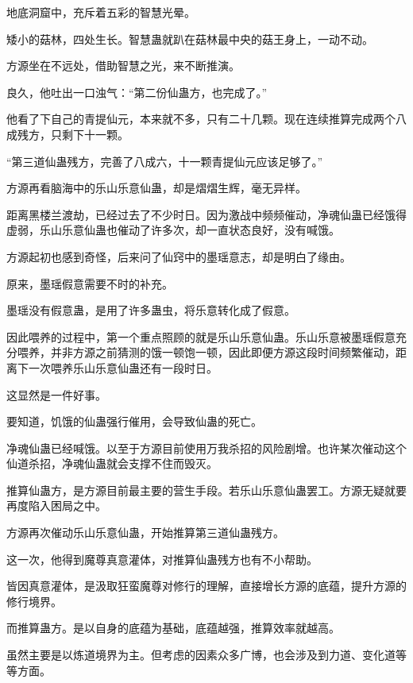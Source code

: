 
\begin{this_body}



地底洞窟中，充斥着五彩的智慧光晕。

矮小的菇林，四处生长。智慧蛊就趴在菇林最中央的菇王身上，一动不动。

方源坐在不远处，借助智慧之光，来不断推演。

良久，他吐出一口浊气：“第二份仙蛊方，也完成了。”

他看了下自己的青提仙元，本来就不多，只有二十几颗。现在连续推算完成两个八成残方，只剩下十一颗。

“第三道仙蛊残方，完善了八成六，十一颗青提仙元应该足够了。”

方源再看脑海中的乐山乐意仙蛊，却是熠熠生辉，毫无异样。

距离黑楼兰渡劫，已经过去了不少时日。因为激战中频频催动，净魂仙蛊已经饿得虚弱，乐山乐意仙蛊也催动了许多次，却一直状态良好，没有喊饿。

方源起初也感到奇怪，后来问了仙窍中的墨瑶意志，却是明白了缘由。

原来，墨瑶假意需要不时的补充。

墨瑶没有假意蛊，是用了许多蛊虫，将乐意转化成了假意。

因此喂养的过程中，第一个重点照顾的就是乐山乐意仙蛊。乐山乐意被墨瑶假意充分喂养，并非方源之前猜测的饿一顿饱一顿，因此即便方源这段时间频繁催动，距离下一次喂养乐山乐意仙蛊还有一段时日。

这显然是一件好事。

要知道，饥饿的仙蛊强行催用，会导致仙蛊的死亡。

净魂仙蛊已经喊饿。以至于方源目前使用万我杀招的风险剧增。也许某次催动这个仙道杀招，净魂仙蛊就会支撑不住而毁灭。

推算仙蛊方，是方源目前最主要的营生手段。若乐山乐意仙蛊罢工。方源无疑就要再度陷入困局之中。

方源再次催动乐山乐意仙蛊，开始推算第三道仙蛊残方。

这一次，他得到魔尊真意灌体，对推算仙蛊残方也有不小帮助。

皆因真意灌体，是汲取狂蛮魔尊对修行的理解，直接增长方源的底蕴，提升方源的修行境界。

而推算蛊方。是以自身的底蕴为基础，底蕴越强，推算效率就越高。

虽然主要是以炼道境界为主。但考虑的因素众多广博，也会涉及到力道、变化道等等方面。


\end{this_body}
